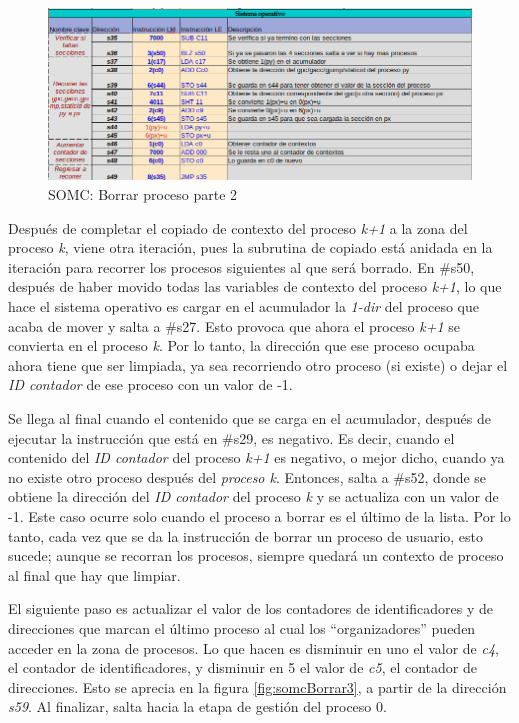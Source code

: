 \documentclass[letterpaper,12pt,oneside]{book}
\begin{document}
		
		\begin{figure}[h]		
			\centering
			\includegraphics[scale=0.53]{media/CARDIACC/SO_Borrar2.png}
			\caption{ SOMC: Borrar proceso parte 2}
			\label{fig:somcBorrar2}
		\end{figure}
		
		Después de completar el copiado de contexto del proceso \textit{k+1} a la zona del proceso \textit{k},
		viene otra iteración, pues la subrutina de copiado está anidada en la iteración para
		recorrer los procesos siguientes al que será borrado. En \#s50, después de haber movido todas las variables de contexto del proceso
		\textit{k+1}, lo que hace el sistema operativo es cargar en el acumulador la \textit{1-dir} del proceso que acaba de mover y salta a \#s27.
		Esto provoca que ahora el proceso \textit{k+1} se convierta en el proceso \textit{k}. Por lo tanto, 
		la dirección que ese proceso
		ocupaba ahora tiene que ser limpiada, ya sea recorriendo otro proceso (si existe) o dejar el \textit{ID contador} de ese proceso
		con un valor de -1. 
		

		Se llega al final cuando el contenido que se carga en el acumulador, después de ejecutar la instrucción que está en \#s29, es
		negativo. Es decir, cuando el contenido del \textit{ID contador} del proceso \textit{k+1} es negativo, o mejor dicho,
		cuando ya no existe otro proceso después del \textit{proceso k}. Entonces, salta a \#s52, donde se obtiene la dirección del \textit{ID contador} 
		del proceso \textit{k}
		y se actualiza con un valor de -1. Este caso ocurre solo cuando el proceso
		a borrar es el último de la lista. Por lo tanto, cada vez que se da la instrucción de borrar un proceso
		de usuario, esto sucede; aunque se recorran los procesos, siempre quedará un contexto de proceso al final que hay que limpiar.
		
		
		El siguiente paso es actualizar el valor de los contadores de identificadores y de direcciones que marcan
		el último proceso  al cual los ``organizadores'' pueden acceder en la zona de procesos. Lo que hacen es disminuir en uno
		el valor de \textit{c4}, el contador de identificadores, y disminuir en 5 el valor de \textit{c5}, el
		contador de direcciones.		
		 Esto se aprecia
		en la figura \ref{fig:somcBorrar3}, a partir de la dirección \textit{s59}. Al finalizar, salta hacia la etapa de gestión del proceso 0.
		
\end{document}
